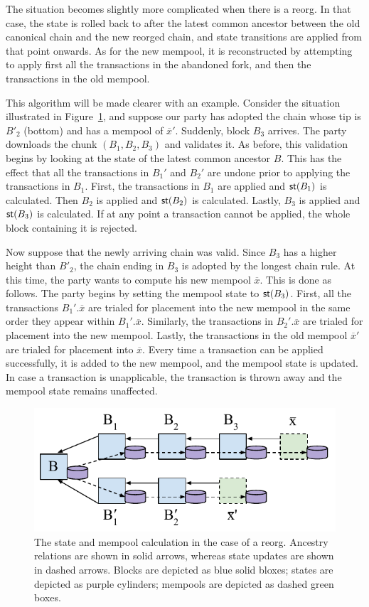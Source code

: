 The situation becomes slightly more complicated when there is a reorg. In that case, the
state is rolled back to after the latest common ancestor between the old canonical chain and
the new reorged chain, and state transitions are applied from that point onwards. As for the
new mempool, it is reconstructed by attempting to apply first all the transactions in the
abandoned fork, and then the transactions in the old mempool.

This algorithm will be made clearer with an example. Consider the situation illustrated in
Figure~\ref{fig.chain-state-validation}, and suppose our party has adopted the chain
whose tip is $B'_2$ (bottom) and has a mempool of $\overline{x}'$. Suddenly, block $B_3$
arrives. The party downloads the chunk $(B_1, B_2, B_3)$ and validates it. As before,
this validation begins by looking at the state of the latest common ancestor $B$.
This has the effect that all the transactions in $B_1'$ and $B_2'$ are undone
prior to applying the transactions in $B_1$.
First, the transactions in $B_1$ are applied and $\mathsf{st}(B_1)$ is calculated. Then
$B_2$ is applied and $\mathsf{st}(B_2)$ is calculated. Lastly, $B_3$ is applied and $\mathsf{st}(B_3)$
is calculated. If at any point a transaction cannot be applied, the whole block containing
it is rejected.

Now suppose that the newly arriving chain was valid. Since $B_3$ has a higher height than $B'_2$,
the chain ending in
$B_3$ is adopted by the longest chain rule.
At this time, the party wants to compute his new mempool $\overline{x}$.
This is done as follows. The party begins by setting the mempool state to $\mathsf{st}(B_3)$.
First, all the transactions $B_1'.\overline{x}$ are trialed for placement into the new
mempool in the same order they appear within $B_1'.\overline{x}$. Similarly, the
transactions in $B_2'.\overline{x}$ are trialed for placement into the new mempool.
Lastly, the transactions in the old mempool $\overline{x}'$ are trialed for placement
into $\overline{x}$. Every time a transaction can be applied successfully, it is
added to the new mempool, and the mempool state is updated. In case a transaction
is unapplicable, the transaction is thrown away and the mempool state remains unaffected.

\begin{figure}[h]
    \centering
    \includegraphics[width=0.7 \columnwidth,keepaspectratio]{figures/chain-state-validation.pdf}
    \caption{The state and mempool calculation in the case of a reorg. Ancestry relations
             are shown in solid arrows, whereas state updates are shown in dashed arrows.
             Blocks are depicted as blue solid bloxes; states are depicted as purple cylinders;
             mempools are depicted as dashed green boxes.}
    \label{fig.chain-state-validation}
\end{figure}


